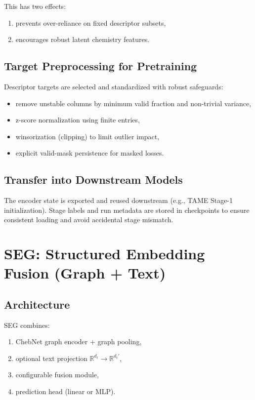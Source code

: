 \documentclass[11pt,a4paper]{article}
\begin{document}
This has two effects:
\begin{enumerate}[label=\alph*)]
    \item prevents over-reliance on fixed descriptor subsets,
    \item encourages robust latent chemistry features.
\end{enumerate}

\subsection{Target Preprocessing for Pretraining}
Descriptor targets are selected and standardized with robust safeguards:
\begin{itemize}
    \item remove unstable columns by minimum valid fraction and non-trivial variance,
    \item z-score normalization using finite entries,
    \item winsorization (clipping) to limit outlier impact,
    \item explicit valid-mask persistence for masked losses.
\end{itemize}

\subsection{Transfer into Downstream Models}
The encoder state is exported and reused downstream (e.g., TAME Stage-1 initialization). Stage labels and run metadata are stored in checkpoints to ensure consistent loading and avoid accidental stage mismatch.

\section{SEG: Structured Embedding Fusion (Graph + Text)}
\subsection{Architecture}
SEG combines:
\begin{enumerate}[label=\arabic*.]
    \item ChebNet graph encoder + graph pooling,
    \item optional text projection $\mathbb{R}^{d_t} \rightarrow \mathbb{R}^{d_t'}$,
    \item configurable fusion module,
    \item prediction head (linear or MLP).
\end{enumerate}
\end{document}
